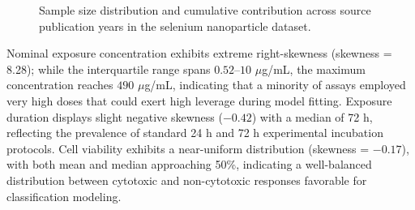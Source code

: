 \begin{figure}[H]
  \centering
  \begin{minipage}{0.48\linewidth}
    \centering
  \end{minipage}
  \hfill
  \begin{minipage}{0.48\linewidth}
    \centering
  \end{minipage}
  \caption{Sample size distribution and cumulative contribution across source publication years in the selenium nanoparticle dataset.}
  \label{fig:senp-year-distribution}
\end{figure}

Nominal exposure concentration exhibits extreme right-skewness (skewness = 8.28); while the interquartile range spans $0.52$--$10$ $\mu$g/mL, the maximum concentration reaches $490$ $\mu$g/mL, indicating that a minority of assays employed very high doses that could exert high leverage during model fitting. Exposure duration displays slight negative skewness ($-0.42$) with a median of 72 h, reflecting the prevalence of standard 24 h and 72 h experimental incubation protocols. Cell viability exhibits a near-uniform distribution (skewness = $-0.17$), with both mean and median approaching 50\%, indicating a well-balanced distribution between cytotoxic and non-cytotoxic responses favorable for classification modeling.

